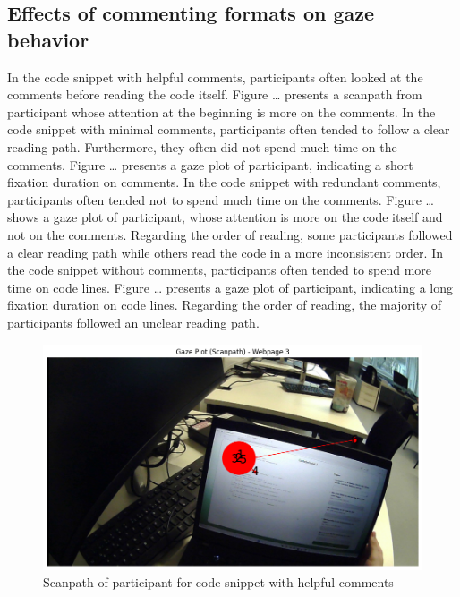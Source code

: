 \subsection{Effects of commenting formats on gaze behavior}

In the code snippet with helpful comments, participants often looked at the comments before reading the code itself.  Figure … presents a scanpath from participant whose attention at the beginning is more on the comments. In the code snippet with minimal comments, participants often tended to follow a clear reading path.  Furthermore, they often did not spend much time on the comments. Figure …  presents a gaze plot of participant, indicating a short fixation duration on comments. In the code snippet with redundant comments, participants often tended not to spend much time on the comments. Figure …  shows a gaze plot of participant, whose attention  is more on the code itself and not on the comments. Regarding the order of reading, some participants followed a clear reading path while others read the code in a more inconsistent order.  In the code snippet without comments, participants often tended to spend more time on code lines. Figure …  presents a gaze plot of participant, indicating a long fixation duration on code lines.    Regarding the order of reading, the majority of participants followed an unclear reading path.

\begin{figure} [H]
  \centering
  \includegraphics[scale=0.6]{figures/h-com.png}
  \caption{Scanpath of participant for code snippet with helpful comments }
  \label{fig:AnhangsChor}
\end{figure}

